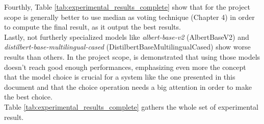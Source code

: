 \documentclass[\main/main.tex]{subfiles}
\begin{document}
Fourthly, Table \ref{tab:experimental_results_complete} show that for the project scope is generally better to use median as voting technique (Chapter 4) in order to compute the final result, as it output the best results. \\
Lastly, not furtherly specialized models like \emph{albert-base-v2} (AlbertBaseV2) and \emph{distilbert-base-multilingual-cased} (DistilbertBaseMultilingualCased) show worse results than others. In the project scope, is demonstrated that using those models doesn't reach good enough performances, emphasizing even more the concept that the model choice is crucial for a system like the one presented in this document and that the choice operation needs a big attention in order to make the best choice. \\


Table \ref{tab:experimental_results_complete} gathers the whole set of experimental result.
\end{document}
